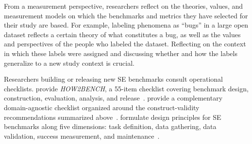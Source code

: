 From a measurement perspective, researchers \should reflect on the theories, values, and measurement models on which the benchmarks and metrics they have selected for their study are based.
For example, labeling phenomena as ``bugs'' in a large open dataset reflects a certain theory of what constitutes a bug, as well as the values and perspectives of the people who labeled the dataset. Reflecting on the context in which these labels were assigned and discussing whether and how the labels generalize to a new study context is crucial.

Researchers building or releasing new SE benchmarks \should consult operational checklists. \citeauthor{cao2025should} provide \emph{HOW2BENCH}, a 55-item checklist covering benchmark design, construction, evaluation, analysis, and release~\cite{cao2025should}. \citeauthor{bean2025measuring} provide a complementary domain-agnostic checklist organized around the construct-validity recommendations summarized above~\cite{bean2025measuring}. \citeauthor{Izadi2026benchmarking} formulate design principles for SE benchmarks along five dimensions: task definition, data gathering, data validation, success measurement, and maintenance~\cite{Izadi2026benchmarking}.



